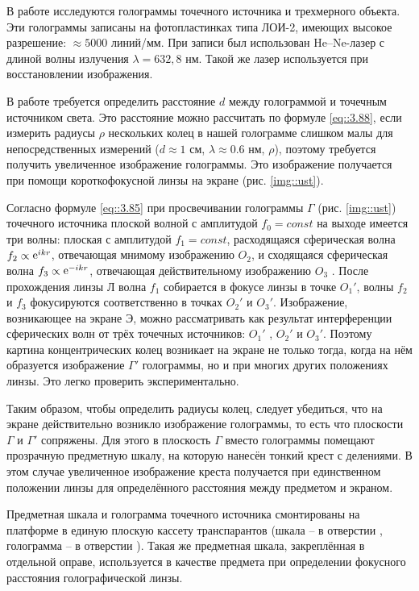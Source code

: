 
В работе исследуются голограммы точечного источника и трехмерного объекта.
Эти голограммы записаны на фотопластинках типа ЛОИ-2, имеющих высокое разрешение:
$\approx 5000$ линий/мм. При записи был использован He--Ne-лазер с длиной волны излучения 
$\lambda = 632,8$ нм. Такой же лазер используется при восстановлении изображения.

В работе требуется определить расстояние $d$ между голограммой и точечным источником
света. Это расстояние можно рассчитать по формуле \eqref{eq::3.88}, если измерить радиусы
$\rho$ нескольких колец в  нашей голограмме слишком малы для непосредственных измерений
($d \approx 1$ см, $\lambda \approx 0.6$ нм, $\rho $), поэтому требуется получить увеличенное
изображение голограммы. Это изображение получается при помощи короткофокусной линзы на
экране (рис. \ref{img::ust}).

Согласно формуле \eqref{eq::3.85} при просвечивании голограммы $\Gamma$ (рис. \ref{img::ust})
точечного источника плоской волной с амплитудой $f_0 = const$ на выходе имеется три волны: 
плоская с амплитудой $f_1 = const$, расходящаяся сферическая волна $f_2 \propto  \mathop{\mathrm e}\nolimits^{ikr}$, 
отвечающая мнимому изображению $O_2$, и сходящаяся сферическая волна $f_3 \propto \mathop{\mathrm e}\nolimits^{-ikr}$,
отвечающая действительному изображению $O_3$ . После прохождения линзы Л волна $f_1$ 
собирается в фокусе линзы в точке $O_1'$, волны $f_2$ и $f_3$ фокусируются соответственно 
в точках $O_2'$ и $O_3'$. Изображение, возникающее на экране Э, можно рассматривать как 
результат интерференции сферических волн от трёх точечных источников: $O_1'$ , $O_2'$ и $O_3'$.
Поэтому картина концентрических колец возникает на экране не только тогда, когда на нём 
образуется изображение $\Gamma'$ голограммы, но и при многих других положениях линзы. 
Это легко проверить экспериментально.

Таким образом, чтобы определить радиусы колец, следует убедиться, что на экране действительно 
возникло изображение голограммы, то есть что плоскости $\Gamma$ и $\Gamma'$ сопряжены. 
Для этого в плоскость $\Gamma$ вместо голограммы помещают прозрачную предметную шкалу, на 
которую нанесён тонкий крест с делениями. В этом случае увеличенное изображение креста 
получается при единственном положении линзы для определённого расстояния между предметом 
и экраном.

Предметная шкала и голограмма точечного источника смонтированы на платформе в единую плоскую 
кассету транспарантов (шкала -- в отверстии , голограмма -- в отверстии 
). Такая же предметная шкала, закреплённая в отдельной оправе, используется в 
качестве предмета при определении фокусного расстояния голографической линзы.

